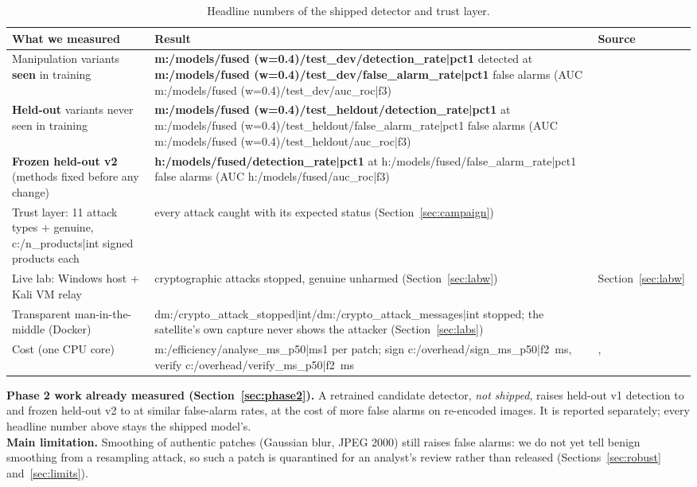 \begin{table}[!htbp]
\centering\small
\begin{tabularx}{\textwidth}{|Y|>{\raggedright\arraybackslash}p{5.4cm}|>{\raggedright\arraybackslash}p{3.4cm}|}
\hline
\textbf{What we measured} & \textbf{Result} & \textbf{Source} \\
\hline
Manipulation variants \textbf{seen} in training & \textbf{{{m:/models/fused (w=0.4)/test_dev/detection_rate|pct1}}} detected at \textbf{{{m:/models/fused (w=0.4)/test_dev/false_alarm_rate|pct1}}} false alarms (AUC {{m:/models/fused (w=0.4)/test_dev/auc_roc|f3}}) & \\
\hline
\textbf{Held-out} variants never seen in training & \textbf{{{m:/models/fused (w=0.4)/test_heldout/detection_rate|pct1}}} at {{m:/models/fused (w=0.4)/test_heldout/false_alarm_rate|pct1}} false alarms (AUC {{m:/models/fused (w=0.4)/test_heldout/auc_roc|f3}}) & \\
\hline
\textbf{Frozen held-out v2} (methods fixed before any change) & \textbf{{{h:/models/fused/detection_rate|pct1}}} at {{h:/models/fused/false_alarm_rate|pct1}} false alarms (AUC {{h:/models/fused/auc_roc|f3}}) & \\
\hline
Trust layer: 11 attack types + genuine, {{c:/n_products|int}} signed products each & every attack caught with its expected status (Section~\ref{sec:campaign}) & \\
\hline
Live lab: Windows host + Kali VM relay &  cryptographic attacks stopped,  genuine unharmed (Section~\ref{sec:labw}) & Section~\ref{sec:labw}\\
\hline
Transparent man-in-the-middle (Docker) & {{dm:/crypto_attack_stopped|int}}/{{dm:/crypto_attack_messages|int}} stopped; the satellite's own capture never shows the attacker (Section~\ref{sec:labs}) & \\
\hline
Cost (one CPU core) & {{m:/efficiency/analyse_ms_p50|ms1}} per patch; sign {{c:/overhead/sign_ms_p50|f2}}~ms, verify {{c:/overhead/verify_ms_p50|f2}}~ms & , \\
\hline
\end{tabularx}
\caption{Headline numbers of the shipped detector and trust layer.}
\end{table}

\begin{warnbox}
\textbf{Phase 2 work already measured (Section~\ref{sec:phase2}).} A retrained candidate detector, \emph{not shipped}, raises held-out v1 detection to  and frozen held-out v2 to  at similar false-alarm rates, at the cost of more false alarms on re-encoded images. It is reported separately; every headline number above stays the shipped model's.\\[3pt]
\textbf{Main limitation.} Smoothing of authentic patches (Gaussian blur, JPEG 2000) still raises false alarms: we do not yet tell benign smoothing from a resampling attack, so such a patch is quarantined for an analyst's review rather than released (Sections~\ref{sec:robust} and~\ref{sec:limits}).
\end{warnbox}

